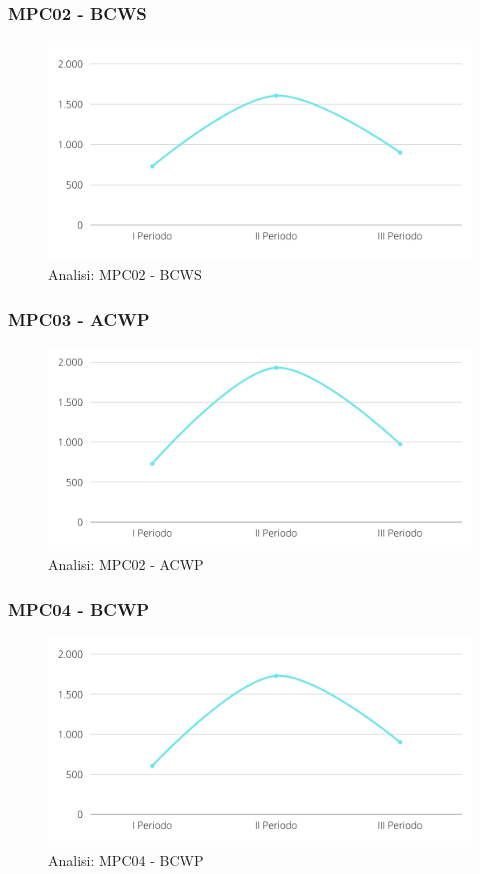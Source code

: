 \subsubsection{MPC02 - BCWS}
\begin{figure}[H]
    \centering
    \includegraphics[scale=0.50]{Sezioni/images/analisi-bcws.png}
    \caption{Analisi: MPC02 - BCWS}
\end{figure}

\subsubsection{MPC03 - ACWP}
\begin{figure}[H]
    \centering
    \includegraphics[scale=0.50]{Sezioni/images/analisi-acwp.png}
    \caption{Analisi: MPC02 - ACWP}
\end{figure}

\subsubsection{MPC04 - BCWP}
\begin{figure}[H]
    \centering
    \includegraphics[scale=0.50]{Sezioni/images/analisi-BCWP.png}
    \caption{Analisi: MPC04 - BCWP}
\end{figure}

